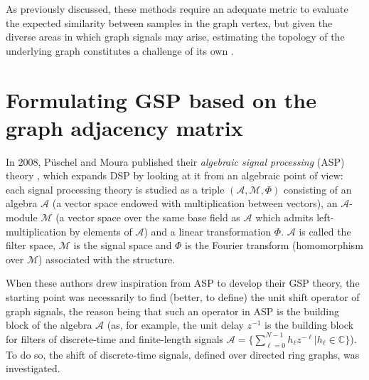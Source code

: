 As previously discussed, these methods require an adequate metric to evaluate the expected similarity between samples in the graph vertex, but given the diverse areas in which graph signals may arise, estimating the topology of the  underlying graph constitutes a challenge of its own \cite{mei2016signal,Sardellitti2016}.

\section{Formulating GSP based on the graph adjacency matrix}
\label{sec:DSPG}

In 2008, P\"uschel and Moura published their \emph{algebraic signal processing} (ASP) theory \cite{puschel2008time,puschel2008space}, which expands DSP by looking at it from an algebraic point of view: each signal processing theory is studied as a triple $ (\mathscr{A}, \mathscr{M}, \Phi) $ consisting of an algebra $ \mathscr{A} $ (a vector space endowed with multiplication between vectors), an $ \mathscr{A} $-module $ \mathscr{M} $ (a vector space over the same base field as $ \mathscr{A} $ which admits left-multiplication by elements of $ \mathscr{A} $) and a linear transformation $ \Phi $. $ \mathscr{A} $ is called the filter space, $ \mathscr{M} $ is the signal space and $ \Phi $ is the Fourier transform (homomorphism over $ \mathscr{M} $) associated with the structure.

When these authors drew inspiration from ASP to develop their GSP theory, the starting point was necessarily to find (better, to define) the unit shift operator of graph signals, the reason being that such an operator in ASP is the building block of the algebra $ \mathscr{A} $ (as, for example, the unit delay $ z^{-1} $ is the building block for filters of discrete-time and finite-length signals $ \mathscr{A}  = \{ \sum_{\ell=0}^{N-1} h_\ell z^{-\ell} | h_\ell \in \mathbb{C} \}$). To do so, the shift of discrete-time signals, defined over directed ring graphs, was investigated.

